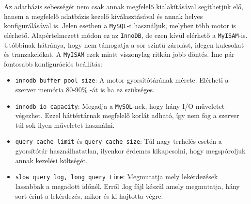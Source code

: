 Az adatbázis sebességét nem csak annak megfelelő kialakításával segíthetjük elő, hanem a megfelelő adatbázis kezelő kiválasztásával és annak helyes konfigurálásával is.
Jelen esetben a \texttt{MySQL}-t használjuk, melyhez több motor is elérhető. Alapértelmezett módon ez az \texttt{InnoDB}, de ezen kívül elérhető a \texttt{MyISAM}-is. Utóbbinak hátránya, hogy nem támogatja a sor szintű zárolást, idegen kulcsokat és tranzakciókat. A \texttt{MyISAM} ezek miatt viszonylag ritkán jobb döntés. Íme pár fontosabb konfigurációs beállítás:
\begin{itemize}
\item \texttt{innodb buffer pool size}: A motor gyorsítótárának mérete. Elérheti a szerver memória 80-90\% -át is ha ez szükséges.
\item \texttt{innodb io capacity}: Megadja a \texttt{MySQL}-nek, hogy hány I/O műveletet végezhet. Ezzel háttértárnak megfelelő korlát adható, így nem fog a szerver túl sok ilyen műveletet használni.
\item \texttt{query cache limit} és \texttt{query cache size}: Túl nagy terhelés esetén a gyorsítótár használhatatlan, ilyenkor érdemes kikapcsolni, hogy megspóroljuk annak kezelési költségét.
\item \texttt{slow query log, long query time}: Megmutatja mely lekérdezések lassabbak a megadott időnél. Erről .log fájl készül amely megmutatja, hány sort érint a lekérdezés, mikor és ki hajtotta végre.
\end{itemize}
